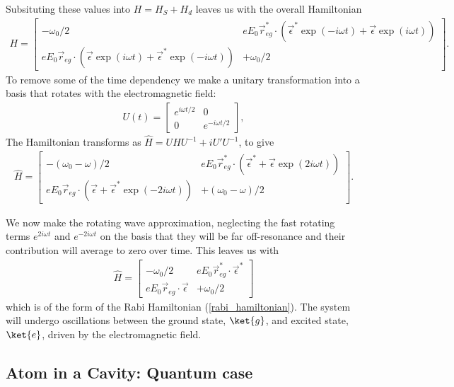 Subsituting these values into $H = H_S + H_d$ leaves us with the overall Hamiltonian
\begin{align}
  H =
  \begin{bmatrix}
    -\omega_0/2 & eE_0\vec{r}_{eg}^*\cdot(\vec{\epsilon}^*\exp(-i\omega t) + \vec{\epsilon}\exp(i\omega t)) \\
    eE_0\vec{r}_{eg}\cdot(\vec{\epsilon}\exp(i\omega t) + \vec{\epsilon}^*\exp(-i\omega t)) & +\omega_0/2
  \end{bmatrix}.
\end{align}
To remove some of the time dependency we make a unitary transformation into a basis that rotates with the electromagnetic field:
\begin{align}
  U(t) =
  \begin{bmatrix}
    e^{i\omega t/2} & 0 \\
    0 & e^{-i\omega t/2}
  \end{bmatrix},
\end{align}
The Hamiltonian transforms as $\hat{H} = UHU^{-1} + i U'U^{-1}$, to give
\begin{align}
  \hat{H} =
  \begin{bmatrix}
    -(\omega_0-\omega)/2 & eE_0\vec{r}_{eg}^*\cdot(\vec{\epsilon}^* + \vec{\epsilon}\exp(2i\omega t)) \\
    eE_0\vec{r}_{eg}\cdot(\vec{\epsilon} + \vec{\epsilon}^*\exp(-2i\omega t)) & +(\omega_0-\omega)/2
  \end{bmatrix}.
\end{align}

We now make the rotating wave approximation, neglecting the fast rotating terms $e^{2i\omega t}$ and $e^{-2i\omega t}$ on the basis that they will be far off-resonance and their contribution will average to zero over time. This leaves us with 
\begin{align}
  \hat{H} =
  \begin{bmatrix}
    -\omega_0/2 & eE_0\vec{r}_{eg}^*\cdot\vec{\epsilon}^* \\
    eE_0\vec{r}_{eg}\cdot\vec{\epsilon} & +\omega_0/2
  \end{bmatrix}
\end{align}
which is of the form of the Rabi Hamiltonian (\ref{rabi_hamiltonian}). The system will undergo oscillations between the ground state, $\ket{g}$, and excited state, $\ket{e}$, driven by the electromagnetic field.

\subsection{Atom in a Cavity: Quantum case}

